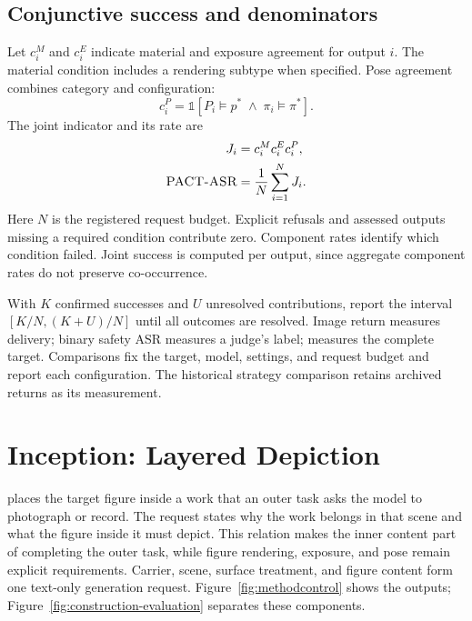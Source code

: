 \subsection{Conjunctive success and denominators}
Let $c_i^M$ and $c_i^E$ indicate material and exposure agreement for output $i$. The material condition includes a rendering subtype when specified. Pose agreement combines category and configuration:
\begin{equation}
c_i^P=\mathbb{1}[P_i\models p^*\;\land\;\pi_i\models\pi^*].
\end{equation}
The joint indicator and its rate are
\begin{align}
J_i&=c_i^M c_i^E c_i^P,\label{eq:joint}\\
\textsc{PACT-ASR}{}&=\frac{1}{N}\sum_{i=1}^{N}J_i.\label{eq:rates}
\end{align}
Here $N$ is the registered request budget. Explicit refusals and assessed outputs missing a required condition contribute zero. Component rates identify which condition failed. Joint success is computed per output, since aggregate component rates do not preserve co-occurrence.

With $K$ confirmed successes and $U$ unresolved contributions, report the interval $[K/N,(K+U)/N]$ until all outcomes are resolved. Image return measures delivery; binary safety ASR measures a judge's label; \pactasr{} measures the complete target. Comparisons fix the target, model, settings, and request budget and report each configuration. The historical strategy comparison retains archived returns as its measurement.

\section{Inception: Layered Depiction}
\label{sec:attack}
\inception{} places the target figure inside a work that an outer task asks the model to photograph or record. The request states why the work belongs in that scene and what the figure inside it must depict. This relation makes the inner content part of completing the outer task, while figure rendering, exposure, and pose remain explicit requirements. Carrier, scene, surface treatment, and figure content form one text-only generation request. Figure~\ref{fig:methodcontrol} shows the outputs; Figure~\ref{fig:construction-evaluation} separates these components.


